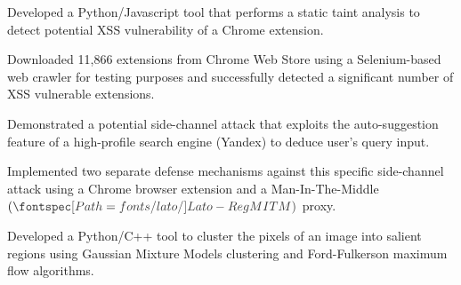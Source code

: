 \documentclass[]{deedy_format_Hien}
\begin{document}
\begin{minipage}[t]{0.66\textwidth}
\vspace{1mm}
\justify
\begin{tightemize}
\item Developed a Python/Javascript tool that performs a static taint analysis to detect potential XSS vulnerability of a Chrome extension. 
\item Downloaded 11,866 extensions from Chrome Web Store using a Selenium-based web crawler for testing purposes and successfully detected a significant number of XSS vulnerable extensions.  
\end{tightemize}
\vspace{\topsep}
\sectionsep


\vspace{1mm}
\justify
\begin{tightemize}
\item Demonstrated a potential side-channel attack that exploits the auto-suggestion feature of a high-profile search engine (Yandex) to deduce user's query input. 
\item Implemented two separate defense mechanisms against this specific side-channel attack using a Chrome browser extension and a Man-In-The-Middle $(\custombold{MITM})$ proxy. 
\end{tightemize}
\vspace{\topsep}
\sectionsep


\vspace{1mm}
\justify
\begin{tightemize}
\item Developed a Python/C++ tool to cluster the pixels of an image into salient regions using Gaussian Mixture Models clustering and Ford-Fulkerson maximum flow algorithms.
\end{tightemize}
\vspace{\topsep}
\sectionsep
%
%
\end{minipage} 
\end{document}
